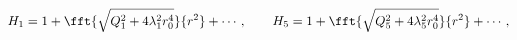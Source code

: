 \begin{equation}
H_1=1+\fft{\sqrt{Q_1^2+4\lambda_1^2r_0^4}}{r^2}+\cdots,\qquad
H_5=1+\fft{\sqrt{Q_5^2+4\lambda_5^2r_0^4}}{r^2}+\cdots,
\end{equation}

